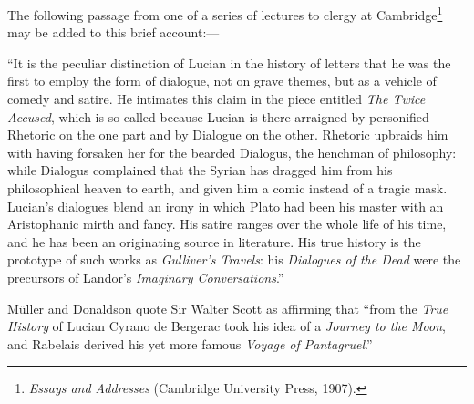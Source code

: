 \documentclass[a4paper, 11pt, oneside, polutonikogreek, english]{article}
\begin{document}
The following passage from one of a series of lectures to clergy at Cambridge\footnote{\emph{Essays and Addresses} (Cambridge University Press, 1907).} may be added to this brief account:---

``It is the peculiar distinction of Lucian in the history of letters that he was the first to employ the form of dialogue, not on grave themes, but as a vehicle of comedy and satire. He intimates this claim in the piece entitled \emph{The Twice Accused}, which is so called because Lucian is there arraigned by personified Rhetoric on the one part and by Dialogue on the other. Rhetoric upbraids him with having forsaken her for the bearded Dialogus, the henchman of philosophy: while Dialogus complained that the Syrian has dragged him from his philosophical heaven to earth, and given him a comic instead of a tragic mask. Lucian's dialogues blend an irony in which Plato had been his master with an Aristophanic mirth and fancy. His satire ranges over the whole life of his time, and he has been an originating source in literature. His true history is the prototype of such works as \emph{Gulliver's Travels}: his \emph{Dialogues of the Dead} were the precursors of Landor's \emph{Imaginary Conversations}.''

Müller and Donaldson quote Sir Walter Scott as affirming that ``from the \emph{True History} of Lucian Cyrano de Bergerac took his idea of a \emph{Journey to the Moon}, and Rabelais derived his yet more famous \emph{Voyage of Pantagruel}.''
\end{document}
